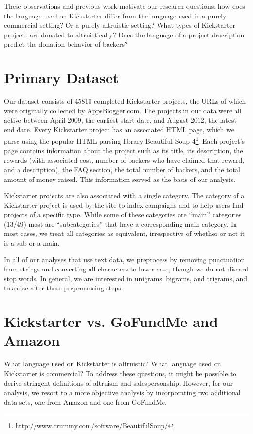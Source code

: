 \documentclass[letterpaper]{article}
\begin{document}
These observations and previous work motivate our research questions: how does the language used on Kickstarter differ from the language used in a purely commercial setting? Or a purely altruistic setting? What types of Kickstarter projects are donated to altruistically? Does the language of a project description predict the donation behavior of backers?

\section{Primary Dataset}
Our dataset consists of 45810 completed Kickstarter projects, the URLs of which were originally collected by AppsBlogger.com. The projects in our data were all active between April 2009, the earliest start date, and August 2012, the latest end date. Every Kickstarter project has an associated HTML page, which we parse using the popular HTML parsing library Beautiful Soup 4\footnote{\url{http://www.crummy.com/software/BeautifulSoup/}}. Each project's page contains information about the project such as its title, its description, the rewards (with associated cost, number of backers who have claimed that reward, and a description), the FAQ section, the total number of backers, and the total amount of money raised. This information served as the basis of our analysis.

Kickstarter projects are also associated with a single category. The category of a Kickstarter project is used by the site to index campaigns and to help users find projects of a specific type. While some of these categories are ``main'' categories (13/49) most are ``subcategories'' that have a corresponding main category. In most cases, we treat all categories as equivalent, irrespective of whether or not it is a sub or a main.

In all of our analyses that use text data, we preprocess by removing punctuation from strings and converting all characters to lower case, though we do not discard stop words. In general, we are interested in unigrams, bigrams, and trigrams, and tokenize after these preprocessing steps.

\section{Kickstarter vs. GoFundMe and Amazon}
What language used on Kickstarter is altruistic? What language used on Kickstarter is commercial? To address these questions, it might be possible to derive stringent definitions of altruism and salespersonship. However, for our analysis, we resort to a more objective analysis by incorporating two additional data sets, one from Amazon and one from GoFundMe.
\end{document}
